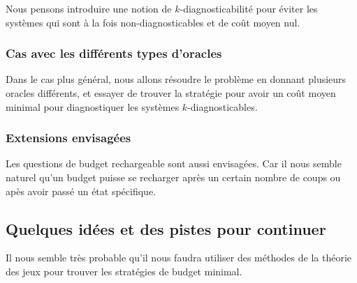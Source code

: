 \documentclass[a4paper,10pt]{article}
\begin{document}
Nous pensons introduire une notion de $k$-diagnosticabilit\'e pour \'eviter les syst\`emes qui sont \`a la fois non-diagnosticables et de co\^ut moyen nul.

\subsubsection{Cas avec les diff\'erents types d'oracles}

Dans le cas plus g\'en\'eral, nous allons r\'esoudre le probl\`eme en donnant plusieurs oracles diff\'erents, et essayer de trouver la strat\'egie pour avoir un co\^ut moyen minimal pour diagnostiquer les syst\`emes $k$-diagnosticables.

\subsubsection{Extensions envisag\'ees}
Les questions de budget rechargeable sont aussi envisag\'ees. Car il nous semble naturel qu'un budget puisse se recharger apr\`es un certain nombre de coups ou ap\`es avoir passé un \'etat sp\'ecifique.

\subsection{Quelques id\'ees et des pistes pour continuer}

Il nous semble tr\`es probable qu'il nous faudra utiliser des m\'ethodes de la th\'eorie des jeux pour trouver les strat\'egies de budget minimal.
\end{document}
